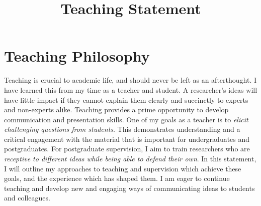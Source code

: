 \documentclass[12pt]{article}
\title{Teaching Statement}
\date{}
\author{}
\begin{document}
\maketitle
\thispagestyle{empty}

\section*{Teaching Philosophy}

Teaching is crucial to academic life, and should never be left as an afterthought.
%
I have learned this from my time as a teacher and student.
%
A researcher's ideas will have little impact if they cannot explain them clearly and succinctly to experts and non-experts alike.
%
Teaching provides a prime opportunity to develop communication and presentation skills.
%
One of my goals as a teacher is to \emph{elicit challenging questions from students}.
%
This demonstrates understanding and a critical engagement with the material that is important for undergraduates and postgraduates.
%
For postgraduate supervision, I aim to train researchers who are \emph{receptive to different ideas while being able to defend their own}.
%
In this statement, I will outline my approaches to teaching and supervision which achieve these goals, and the experience which has shaped them.
%
I am eager to continue teaching and develop new and engaging ways of communicating ideas to students and colleagues.

\iffalse
Teaching is essential to academic life and should never be dismissed as an afterthought.
%
Academics cannot succeed without the ability to clearly, succinctly explain their ideas.
%
In particular, they should be able to communicate with non-experts; teaching provides the perfect opportunity to develop this skill.
%
%
Teaching should be engaging and stimulating for students.

I'm early in my teaching career, but look forward to developing interesting and entertaining teaching methods through an active dialogue with students.

From my experience teaching, and as a student, I've found that grounding content into practical real-world examples, providing hands on work, and covering state-of-the-art methods and ideas are key ways to achieve this.
%
An indicator of a teacher's success is the questions they receive from students.
% 
If a teacher receives novel, challenging questions, the students have understood the material and are engaging with it critically.
%
This should be the ultimate goal of teaching, and is what I aim for.
%
This is particularly applicable to postgraduates, who we should teach to view the world with a critical eye and develop original ideas.
\fi
\end{document}
